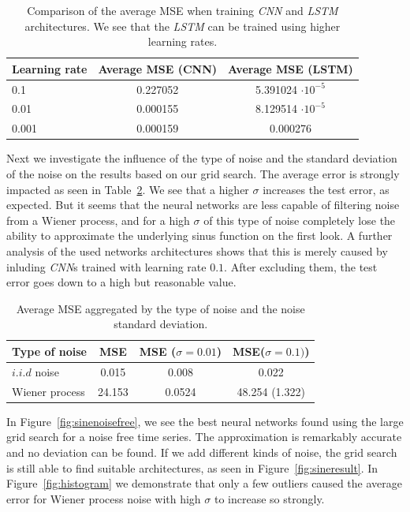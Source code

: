 \documentclass{article}
\begin{document}
\begin{table}
    \centering
    \begin{tabular}{l|c|c}
        Learning rate & Average MSE (CNN) & Average MSE (LSTM)       \\
        \hline
        0.1           & 0.227052          & 5.391024 $\cdot 10^{-5}$ \\
        0.01          & 0.000155          & 8.129514 $\cdot 10^{-5}$ \\
        0.001         & 0.000159          & 0.000276                 \\
    \end{tabular}
    \caption{Comparison of the average MSE when training \emph{CNN} and
        \emph{LSTM} architectures. We see that the \emph{LSTM} can be trained
        using higher learning rates.}
    \label{tab:cnn_training}
\end{table}

Next we investigate the influence of the type of noise
and the standard deviation of the noise on the results 
based on our grid search. The average error is
strongly impacted as seen in Table~\ref{tab:wiener_iid}. We see that
a higher $\sigma$ increases the test error, as expected. But it seems that the 
neural networks are less capable of filtering noise from a Wiener process, and 
for a high $\sigma$ of this type of noise completely lose the ability to 
approximate the underlying sinus function on the first look. A further analysis
of the used networks architectures shows that this is merely caused by inluding 
\emph{CNN}s trained with learning rate $0.1$. After excluding them, the test 
error goes down to a high but reasonable value.

\begin{table}
    \centering
    \begin{tabular}{l|ccc}
        Type of noise & MSE & MSE ($\sigma=0.01$) & MSE($\sigma=0.1)$) \\
        \hline
        $i.i.d$ noise &   0.015 & 0.008  &  0.022 \\
        Wiener process & 24.153 & 0.0524 & 48.254 (1.322) \\
    \end{tabular}
    \caption{Average MSE aggregated by the type of noise and the noise
        standard deviation.}
    \label{tab:wiener_iid}
\end{table}

In Figure~\ref{fig:sinenoisefree}, we see the best neural networks found using 
the large grid search for a noise free time series. The approximation is 
remarkably accurate and no deviation can be found. If we add different kinds of 
noise, the grid search is still able to find suitable architectures, 
as seen in Figure~\ref{fig:sineresult}. In Figure~\ref{fig:histogram}
we demonstrate that only a few outliers caused the average error 
for Wiener process noise with high $\sigma$ to increase so strongly.
\end{document}
